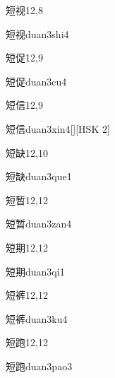 \begin{entry}{短视}{12,8}
  \begin{phonetics}{短视}{duan3shi4}
  \end{phonetics}
\end{entry}

\begin{entry}{短促}{12,9}
  \begin{phonetics}{短促}{duan3cu4}
  \end{phonetics}
\end{entry}

\begin{entry}{短信}{12,9}
  \begin{phonetics}{短信}{duan3xin4}[][HSK 2]
  \end{phonetics}
\end{entry}

\begin{entry}{短缺}{12,10}
  \begin{phonetics}{短缺}{duan3que1}
  \end{phonetics}
\end{entry}

\begin{entry}{短暂}{12,12}
  \begin{phonetics}{短暂}{duan3zan4}
  \end{phonetics}
\end{entry}

\begin{entry}{短期}{12,12}
  \begin{phonetics}{短期}{duan3qi1}
  \end{phonetics}
\end{entry}

\begin{entry}{短裤}{12,12}
  \begin{phonetics}{短裤}{duan3ku4}
  \end{phonetics}
\end{entry}

\begin{entry}{短跑}{12,12}
  \begin{phonetics}{短跑}{duan3pao3}
  \end{phonetics}
\end{entry}

